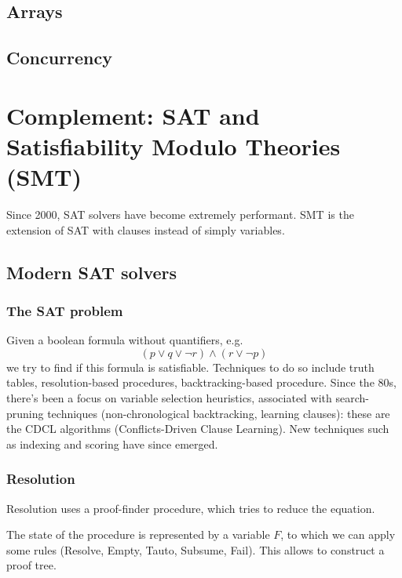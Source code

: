 \documentclass[toc]{../cs-classes/cs-classes}
\begin{document}
\subsection{Arrays}

\subsection{Concurrency}







\newpage
\section{Complement: SAT and Satisfiability Modulo Theories (SMT)}
Since 2000, SAT solvers have become extremely performant. SMT is the extension of SAT with clauses instead of simply variables.
\subsection{Modern SAT solvers}
\subsubsection{The SAT problem}
Given a boolean formula without quantifiers, e.g.
\begin{equation*}
    (p\lor q\lor \lnot r)\land(r\lor \lnot p)
\end{equation*}
we try to find if this formula is satisfiable. Techniques to do so include truth tables, resolution-based procedures, backtracking-based procedure. Since the 80s, there's been a focus on variable selection heuristics, associated with search-pruning techniques (non-chronological backtracking, learning clauses): these are the CDCL algorithms (Conflicts-Driven Clause Learning). New techniques such as indexing and scoring have since emerged.

\subsubsection{Resolution}
Resolution uses a proof-finder procedure, which tries to reduce the equation.

The state of the procedure is represented by a variable $F$, to which we can apply some rules (Resolve, Empty, Tauto, Subsume, Fail). This allows to construct a proof tree.
\end{document}
